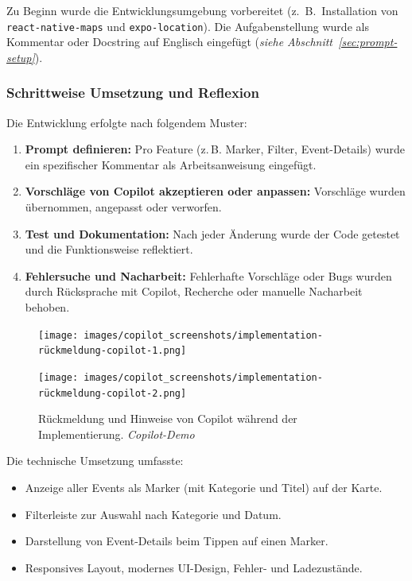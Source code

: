 Zu Beginn wurde die Entwicklungsumgebung vorbereitet (z.~B.\ Installation von
\texttt{react-native-maps} und \texttt{expo-location}). Die Aufgabenstellung
wurde als Kommentar oder Docstring auf Englisch eingefügt (\emph{siehe
      Abschnitt~\ref{sec:prompt-setup}}).

\subsubsection{Schrittweise Umsetzung und Reflexion}
Die Entwicklung erfolgte nach folgendem Muster:
\begin{enumerate}
      \item \textbf{Prompt definieren:} Pro Feature (z.\,B. Marker, Filter, Event-Details) wurde ein spezifischer Kommentar als Arbeitsanweisung eingefügt.
      \item \textbf{Vorschläge von Copilot akzeptieren oder anpassen:} Vorschläge wurden übernommen, angepasst oder verworfen.
      \item \textbf{Test und Dokumentation:} Nach jeder Änderung wurde der Code getestet und die Funktionsweise reflektiert.
      \item \textbf{Fehlersuche und Nacharbeit:} Fehlerhafte Vorschläge oder Bugs wurden durch Rücksprache mit Copilot, Recherche oder manuelle Nacharbeit behoben.
\end{enumerate}

\begin{figure}[htbp]
      \centering
      \vspace{1em}
      \begin{minipage}{0.48\textwidth}
            \centering
            \texttt{[image: images/copilot\_screenshots/implementation-rückmeldung-copilot-1.png]}
      \end{minipage}
      \hfill
      \begin{minipage}{0.48\textwidth}
            \centering
            \texttt{[image: images/copilot\_screenshots/implementation-rückmeldung-copilot-2.png]}
      \end{minipage}
      \caption{Rückmeldung und Hinweise von Copilot während der Implementierung. \textit{Copilot-Demo}}
      \label{fig:copilot-impl-pair}
\end{figure}

\noindent Die technische Umsetzung umfasste:
\begin{itemize}
      \item Anzeige aller Events als Marker (mit Kategorie und Titel) auf der Karte.
      \item Filterleiste zur Auswahl nach Kategorie und Datum.
      \item Darstellung von Event-Details beim Tippen auf einen Marker.
      \item Responsives Layout, modernes UI-Design, Fehler- und Ladezustände.
\end{itemize}

